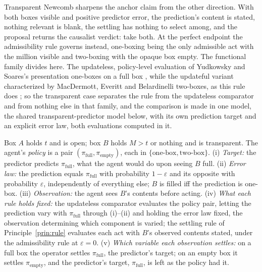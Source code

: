 Transparent Newcomb sharpens the anchor claim from the other direction. With both boxes visible and positive predictor error, the prediction's content is stated, nothing relevant is blank, the settling has nothing to select among, and the proposal returns the causalist verdict: take both. At the perfect endpoint the admissibility rule governs instead, one-boxing being the only admissible act with the million visible and two-boxing with the opaque box empty. The functional family divides here. The updateless, policy-level evaluation of Yudkowsky and Soares's presentation one-boxes on a full box \cite{soares2017fdt}, while the updateful variant characterized by MacDermott, Everitt and Belardinelli two-boxes, as this rule does \cite{macdermott2023characterising}; so the transparent case separates the rule from the updateless comparator and from nothing else in that family, and the comparison is made in one model, the shared transparent-predictor model below, with its own prediction target and an explicit error law, both evaluations computed in it.

\begin{definition}\label{def:shared-model}
Box $A$ holds $t$ and is open; box $B$ holds $M > t$ or nothing and is transparent. The agent's \emph{policy} is a pair $(\pi_{\mathrm{full}}, \pi_{\mathrm{empty}})$, each in $\{\text{one-box}, \text{two-box}\}$. (i) \emph{Target:} the predictor predicts $\pi_{\mathrm{full}}$, what the agent would do upon seeing $B$ full. (ii) \emph{Error law:} the prediction equals $\pi_{\mathrm{full}}$ with probability $1 - \varepsilon$ and its opposite with probability $\varepsilon$, independently of everything else; $B$ is filled iff the prediction is one-box. (iii) \emph{Observation:} the agent sees $B$'s contents before acting. (iv) \emph{What each rule holds fixed:} the updateless comparator evaluates the policy pair, letting the prediction vary with $\pi_{\mathrm{full}}$ through (i)--(ii) and holding the error law fixed, the observation determining which component is varied; the settling rule of Principle~\ref{prin:rule} evaluates each act with $B$'s observed contents stated, under the admissibility rule at $\varepsilon = 0$. (v) \emph{Which variable each observation settles:} on a full box the operator settles $\pi_{\mathrm{full}}$, the predictor's target; on an empty box it settles $\pi_{\mathrm{empty}}$, and the predictor's target, $\pi_{\mathrm{full}}$, is left as the policy had it.
\end{definition}

